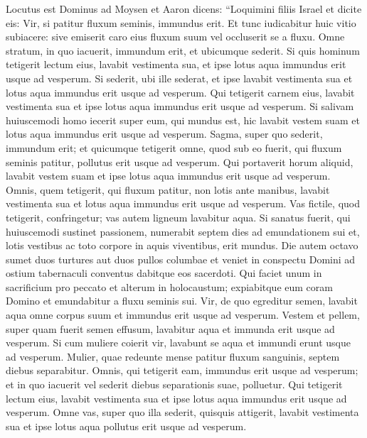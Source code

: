 \begin{biblechapter}  
\verse Locutus est Dominus ad Moysen et Aaron dicens: 
\verse “Loquimini filiis Israel et dicite eis: Vir, si patitur fluxum seminis, immundus erit. 
\verse Et tunc iudicabitur huic vitio subiacere: sive emiserit caro eius fluxum suum vel occluserit se a fluxu. 
\verse Omne stratum, in quo iacuerit, immundum erit, et ubicumque sederit. 
\verse Si quis hominum tetigerit lectum eius, lavabit vestimenta sua, et ipse lotus aqua immundus erit usque ad vesperum. 
\verse Si sederit, ubi ille sederat, et ipse lavabit vestimenta sua et lotus aqua immundus erit usque ad vesperum. 
\verse Qui tetigerit carnem eius, lavabit vestimenta sua et ipse lotus aqua immundus erit usque ad vesperum. 
\verse Si salivam huiuscemodi homo iecerit super eum, qui mundus est, hic lavabit vestem suam et lotus aqua immundus erit usque ad vesperum. 
\verse Sagma, super quo sederit, immundum erit;  
\verse et quicumque tetigerit omne, quod sub eo fuerit, qui fluxum seminis patitur, pollutus erit usque ad vesperum. Qui portaverit horum aliquid, lavabit vestem suam et ipse lotus aqua immundus erit usque ad vesperum. 
\verse Omnis, quem tetigerit, qui fluxum patitur, non lotis ante manibus, lavabit vestimenta sua et lotus aqua immundus erit usque ad vesperum. 
\verse Vas fictile, quod tetigerit, confringetur; vas autem ligneum lavabitur aqua. 
\verse Si sanatus fuerit, qui huiuscemodi sustinet passionem, numerabit septem dies ad emundationem sui et, lotis vestibus ac toto corpore in aquis viventibus, erit mundus. 
\verse Die autem octavo sumet duos turtures aut duos pullos columbae et veniet in conspectu Domini ad ostium tabernaculi conventus dabitque eos sacerdoti. 
\verse Qui faciet unum in sacrificium pro peccato et alterum in holocaustum; expiabitque eum coram Domino et emundabitur a fluxu seminis sui. 
\verse Vir, de quo egreditur semen, lavabit aqua omne corpus suum et immundus erit usque ad vesperum. 
\verse Vestem et pellem, super quam fuerit semen effusum, lavabitur aqua et immunda erit usque ad vesperum. 
\verse Si cum muliere coierit vir, lavabunt se aqua et immundi erunt usque ad vesperum. 
\verse Mulier, quae redeunte mense patitur fluxum sanguinis, septem diebus separabitur. Omnis, qui tetigerit eam, immundus erit usque ad vesperum; 
\verse et in quo iacuerit vel sederit diebus separationis suae, polluetur. 
\verse Qui tetigerit lectum eius, lavabit vestimenta sua et ipse lotus aqua immundus erit usque ad vesperum. 
\verse Omne vas, super quo illa sederit, quisquis attigerit, lavabit vestimenta sua et ipse lotus aqua pollutus erit usque ad vesperum.  

\end{biblechapter}
